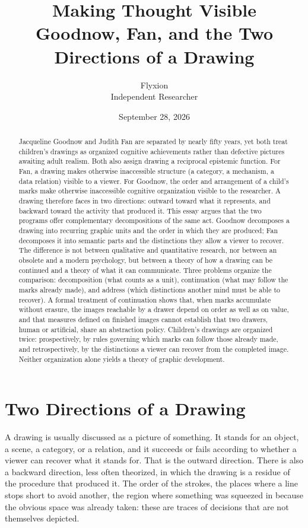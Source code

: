 \documentclass[11pt]{article}
\title{\textbf{Making Thought Visible}\\[0.4em]
\large Goodnow, Fan, and the Two Directions of a Drawing}
\author{Flyxion\\ \small Independent Researcher}
\date{September 28, 2026}
\theoremstyle{remark}
\begin{document}
\maketitle

\begin{abstract}
\noindent
Jacqueline Goodnow and Judith Fan are separated by nearly fifty years, yet both treat children's drawings as organized cognitive achievements rather than defective pictures awaiting adult realism. Both also assign drawing a reciprocal epistemic function. For Fan, a drawing makes otherwise inaccessible structure (a category, a mechanism, a data relation) visible to a viewer. For Goodnow, the order and arrangement of a child's marks make otherwise inaccessible cognitive organization visible to the researcher. A drawing therefore faces in two directions: outward toward what it represents, and backward toward the activity that produced it. This essay argues that the two programs offer complementary decompositions of the same act. Goodnow decomposes a drawing into recurring graphic units and the order in which they are produced; Fan decomposes it into semantic parts and the distinctions they allow a viewer to recover. The difference is not between qualitative and quantitative research, nor between an obsolete and a modern psychology, but between a theory of how a drawing can be continued and a theory of what it can communicate. Three problems organize the comparison: decomposition (what counts as a unit), continuation (what may follow the marks already made), and address (which distinctions another mind must be able to recover). A formal treatment of continuation shows that, when marks accumulate without erasure, the images reachable by a drawer depend on order as well as on value, and that measures defined on finished images cannot establish that two drawers, human or artificial, share an abstraction policy. Children's drawings are organized twice: prospectively, by rules governing which marks can follow those already made, and retrospectively, by the distinctions a viewer can recover from the completed image. Neither organization alone yields a theory of graphic development.
\end{abstract}

\clearpage
\tableofcontents
\clearpage

\section{Two Directions of a Drawing}

A drawing is usually discussed as a picture of something. It stands for an object, a scene, a category, or a relation, and it succeeds or fails according to whether a viewer can recover what it stands for. That is the outward direction. There is also a backward direction, less often theorized, in which the drawing is a residue of the procedure that produced it. The order of the strokes, the places where a line stops short to avoid another, the region where something was squeezed in because the obvious space was already taken: these are traces of decisions that are not themselves depicted.
\end{document}
